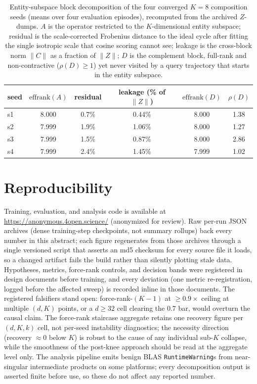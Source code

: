\documentclass[mlabstract,onecolumn]{jmlr}
\begin{document}
\begin{table}[!htb]
\centering
\small
\begin{tabular}{lccccc}
\toprule
seed & $\mathrm{effrank}(A)$ & residual & leakage (\% of $\|Z\|$) & $\mathrm{effrank}(D)$ & $\rho(D)$ \\
\midrule
s1 & 8.000 & 0.7\% & 0.44\% & 8.000 & 1.38 \\
s2 & 7.999 & 1.9\% & 1.06\% & 8.000 & 1.27 \\
s3 & 7.999 & 1.5\% & 0.87\% & 8.000 & 2.86 \\
s4 & 7.999 & 2.4\% & 1.45\% & 7.999 & 1.02 \\
\bottomrule
\end{tabular}
\caption{Entity-subspace block decomposition of the four converged
$K{=}8$ composition seeds (means over four evaluation episodes),
recomputed from the archived $Z$-dumps. $A$ is the operator restricted
to the $K$-dimensional entity subspace; residual is the scale-corrected
Frobenius distance to the ideal cycle after fitting the single isotropic
scale that cosine scoring cannot see; leakage is the cross-block norm
$\|C\|$ as a fraction of $\|Z\|$; $D$ is the complement block, full-rank
and non-contractive ($\rho(D) \geq 1$) yet never visited by a query
trajectory that starts in the entity subspace.}
\label{tab:subspace}
\end{table}

\section{Reproducibility}
\label{app:repro}

Training, evaluation, and analysis code is available at
\url{https://anonymous.4open.science/} (anonymized for review). Raw
per-run JSON archives (dense training-step checkpoints, not summary
rollups) back every number in this abstract; each figure regenerates
from those archives through a single versioned script that asserts an
md5 checksum for every source file it loads, so a changed artifact fails
the build rather than silently plotting stale data. Hypotheses, metrics,
force-rank controls, and decision bands were registered in design
documents before training, and every deviation (one metric
re-registration, logged before the affected sweep) is recorded inline
in those documents. The registered falsifiers stand open:
force-rank-$(K{-}1)$ at $\geq 0.9\times$ ceiling at multiple $(d, K)$
points, or a $d \geq 32$ cell clearing the 0.7 bar, would overturn the
causal claim.
The force-rank staircase aggregate retains one recovery figure per
$(d, K, k)$ cell, not per-seed instability diagnostics; the necessity
direction (recovery $\approx 0$ below $K$) is robust to the cause of
any individual sub-$K$ collapse, while the smoothness of the post-knee
approach should be read at the aggregate level only.
The analysis pipeline emits benign BLAS \texttt{RuntimeWarning}s from
near-singular intermediate products on some platforms; every
decomposition output is asserted finite before use, so these do not
affect any reported number.



\end{document}
